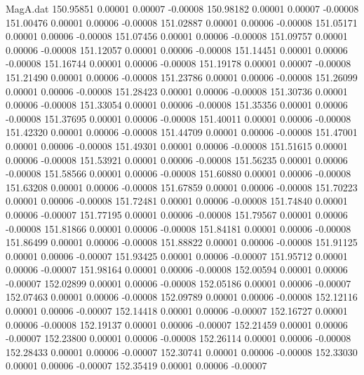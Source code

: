 \begin{filecontents}{MagA.dat}
 150.95851    0.00001    0.00007   -0.00008
 150.98182    0.00001    0.00007   -0.00008
 151.00476    0.00001    0.00006   -0.00008
 151.02887    0.00001    0.00006   -0.00008
 151.05171    0.00001    0.00006   -0.00008
 151.07456    0.00001    0.00006   -0.00008
 151.09757    0.00001    0.00006   -0.00008
 151.12057    0.00001    0.00006   -0.00008
 151.14451    0.00001    0.00006   -0.00008
 151.16744    0.00001    0.00006   -0.00008
 151.19178    0.00001    0.00007   -0.00008
 151.21490    0.00001    0.00006   -0.00008
 151.23786    0.00001    0.00006   -0.00008
 151.26099    0.00001    0.00006   -0.00008
 151.28423    0.00001    0.00006   -0.00008
 151.30736    0.00001    0.00006   -0.00008
 151.33054    0.00001    0.00006   -0.00008
 151.35356    0.00001    0.00006   -0.00008
 151.37695    0.00001    0.00006   -0.00008
 151.40011    0.00001    0.00006   -0.00008
 151.42320    0.00001    0.00006   -0.00008
 151.44709    0.00001    0.00006   -0.00008
 151.47001    0.00001    0.00006   -0.00008
 151.49301    0.00001    0.00006   -0.00008
 151.51615    0.00001    0.00006   -0.00008
 151.53921    0.00001    0.00006   -0.00008
 151.56235    0.00001    0.00006   -0.00008
 151.58566    0.00001    0.00006   -0.00008
 151.60880    0.00001    0.00006   -0.00008
 151.63208    0.00001    0.00006   -0.00008
 151.67859    0.00001    0.00006   -0.00008
 151.70223    0.00001    0.00006   -0.00008
 151.72481    0.00001    0.00006   -0.00008
 151.74840    0.00001    0.00006   -0.00007
 151.77195    0.00001    0.00006   -0.00008
 151.79567    0.00001    0.00006   -0.00008
 151.81866    0.00001    0.00006   -0.00008
 151.84181    0.00001    0.00006   -0.00008
 151.86499    0.00001    0.00006   -0.00008
 151.88822    0.00001    0.00006   -0.00008
 151.91125    0.00001    0.00006   -0.00007
 151.93425    0.00001    0.00006   -0.00007
 151.95712    0.00001    0.00006   -0.00007
 151.98164    0.00001    0.00006   -0.00008
 152.00594    0.00001    0.00006   -0.00007
 152.02899    0.00001    0.00006   -0.00008
 152.05186    0.00001    0.00006   -0.00007
 152.07463    0.00001    0.00006   -0.00008
 152.09789    0.00001    0.00006   -0.00008
 152.12116    0.00001    0.00006   -0.00007
 152.14418    0.00001    0.00006   -0.00007
 152.16727    0.00001    0.00006   -0.00008
 152.19137    0.00001    0.00006   -0.00007
 152.21459    0.00001    0.00006   -0.00007
 152.23800    0.00001    0.00006   -0.00008
 152.26114    0.00001    0.00006   -0.00008
 152.28433    0.00001    0.00006   -0.00007
 152.30741    0.00001    0.00006   -0.00008
 152.33030    0.00001    0.00006   -0.00007
 152.35419    0.00001    0.00006   -0.00007

\end{filecontents}
